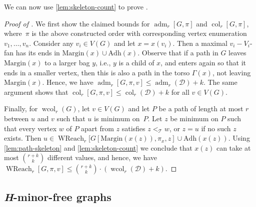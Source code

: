\documentclass[1p,number,a4paper]{elsarticle}
\theoremstyle{remark}
\newcommand{\Dd}{\mathscr{D}}
\newcommand{\Tt}{\mathcal{T}}
\newcommand{\adh}{\mathrm{Adh}}
\newcommand{\mrg}{\mathrm{Margin}}
\DeclareMathOperator{\col}{col}
\DeclareMathOperator{\wcol}{wcol}
\DeclareMathOperator{\adm}{adm}
\DeclareMathOperator{\WReach}{WReach}
\begin{document}
We can now use \cref{lem:skeleton-count} to prove .

\begin{proof}[Proof of ]

We first show the claimed bounds for $\adm_r[G,\pi]$ and $\col_r[G,\pi]$, where~$\pi$ is the above constructed order with corresponding vertex enumeration $v_1,\ldots, v_n$.  
Consider any $v_i\in V(G)$ and let $x=x(v_i)$. Then 
a maximal $v_i-V_i$-fan has its ends in $\mrg(x)\cup \adh(x)$. 
Observe that if a path in $G$ leaves $\mrg(x)$ to a larger
bag $y$, i.e., $y$ is a child of $x$, and enters again so that
it ends in a smaller vertex, then this is also a path in the torso
$\Gamma(x)$, not leaving $\mrg(x)$. 
Hence, we have $\adm_r[G,\pi,v]\leq \adm_r(\Dd)+k$. 
The same argument shows that $\col_r[G,\pi,v]\leq \col_r(\Dd)+k$ for all $v\in V(G)$.

Finally, for $\wcol_r(G)$, let $v\in V(G)$ and let $P$ be a path of length at most $r$
between $u$ and $v$ such that $u$ is minimum on~$P$. Let 
$z$ be minimum on $P$ such that every vertex $w$ of $P$ 
apart from $z$ satisfies $z<_\mathcal{T} w$, or $z=u$ if 
no such $z$ exists. Then $u\in \WReach_r[G[\mrg(x(z)),\pi_x, z]\cup
\adh(x(z))$. 
Using
\cref{lem:path-skeleton} and \cref{lem:skeleton-count} we conclude
that $x(z)$ can take at most $\binom{r+k}{k}$ different values, 
and hence, we have $\WReach_r[G,\pi, v]\leq \binom{r+k}{k}\cdot (\wcol_r(\Dd)+k)$. 
\end{proof}

\subsection{\textit{H}-minor-free graphs}
\end{document}
